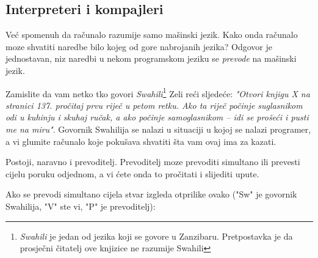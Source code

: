 \subsection{Interpreteri i kompajleri}

	Već spomenuh da računalo razumije samo mašinski jezik. Kako onda
	računalo moze shvatiti naredbe bilo kojeg od gore nabrojanih jezika?
	Odgovor je jednostavan, niz naredbi u nekom programskom jeziku se \emph{prevode} na
	mašinski jezik. 

	Zamislite da vam netko tko govori \emph{Swahili}\footnote{\emph{Swahili}
	je jedan od jezika koji se govore u Zanzibaru. Pretpostavka je da prosječni
	čitatelj ove knjizice ne razumije Swahili} Zeli reći sljedeće:
	\emph{"Otvori knjigu X na stranici 137. pročitaj prvu riječ u petom retku.
	Ako ta riječ počinje suglasnikom odi u kuhinju i skuhaj ručak, a ako
	počinje samoglasnikom -- idi se prošeći i pusti me na miru"}.
	Govornik Swahilija se nalazi u situaciji u kojoj se nalazi programer, a vi glumite
	računalo koje pokušava shvatiti šta vam ovaj ima za kazati. 
	
	Postoji, naravno i prevoditelj. Prevoditelj moze prevoditi simultano ili
	prevesti cijelu poruku odjednom, a vi ćete onda to pročitati i slijediti
	upute. 

	Ako se prevodi simultano cijela stvar izgleda otprilike ovako ("Sw" je govornik
	Swahilija, "V" ste vi, "P" je prevoditelj):

